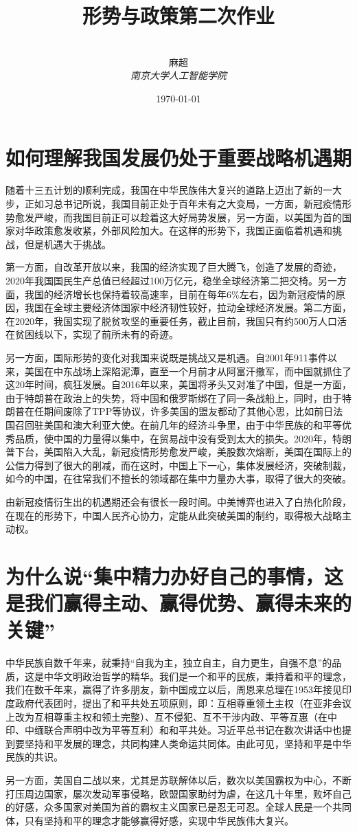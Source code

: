 \documentclass[12pt,a4paper]{article}
\title{\textbf{形势与政策第二次作业}}%
\author{
\\
\Large{麻超 \quad 201300066}
\\[6pt]
{ \large \textit{南京大学人工智能学院}}\\[2pt]
}
\date{\today}
\begin{document}
\maketitle
\setcounter{page}{1}
\section{如何理解我国发展仍处于重要战略机遇期}
随着十三五计划的顺利完成，我国在中华民族伟大复兴的道路上迈出了新的一大步，正如习总书记所说，我国目前正处于百年未有之大变局，一方面，新冠疫情形势愈发严峻，而我国目前正可以趁着这大好局势发展，另一方面，以美国为首的国家对华政策愈发收紧，外部风险加大。在这样的形势下，我国正面临着机遇和挑战，但是机遇大于挑战。
\par
第一方面，自改革开放以来，我国的经济实现了巨大腾飞，创造了发展的奇迹，2020年我国国民生产总值已经超过100万亿元，稳坐全球经济第二把交椅。另一方面，我国的经济增长也保持着较高速率，目前在每年6\%左右，因为新冠疫情的原因，我国在全球主要经济体国家中经济韧性较好，拉动全球经济发展。第二方面，在2020年，我国实现了脱贫攻坚的重要任务，截止目前，我国只有约500万人口活在贫困线以下，实现了前所未有的奇迹。
\par
另一方面，国际形势的变化对我国来说既是挑战又是机遇。自2001年911事件以来，美国在中东战场上深陷泥潭，直至一个月前才从阿富汗撤军，而中国就抓住了这20年时间，疯狂发展。自2016年以来，美国将矛头又对准了中国，但是一方面，由于特朗普在政治上的失势，将中国和俄罗斯绑在了同一条战船上，同时，由于特朗普在任期间废除了TPP等协议，许多美国的盟友都动了其他心思，比如前日法国召回驻美国和澳大利亚大使。在前几年的经济斗争里，由于中华民族的和平等优秀品质，使中国的力量得以集中，在贸易战中没有受到太大的损失。2020年，特朗普下台，美国陷入大乱，新冠疫情形势愈发严峻，美股数次熔断，美国在国际上的公信力得到了很大的削减，而在这时，中国上下一心，集体发展经济，突破制裁，如今的中国，在往常我们不擅长的领域都在集中力量办大事，取得了很大的突破。
\par
由新冠疫情衍生出的机遇期还会有很长一段时间。中美博弈也进入了白热化阶段，在现在的形势下，中国人民齐心协力，定能从此突破美国的制约，取得极大战略主动权。
\section{为什么说“集中精力办好自己的事情，这是我们赢得主动、赢得优势、赢得未来的关键”}
中华民族自数千年来，就秉持“自我为主，独立自主，自力更生，自强不息”的品质，这是中华文明政治哲学的精华。我们是一个和平的民族，秉持着和平的理念，我们在数千年来，赢得了许多朋友，新中国成立以后，周恩来总理在1953年接见印度政府代表团时，提出了和平共处五项原则，即：互相尊重领土主权（在亚非会议上改为互相尊重主权和领土完整）、互不侵犯、互不干涉内政、平等互惠（在中印、中缅联合声明中改为平等互利）和和平共处。习近平总书记在数次讲话中也提到要坚持和平发展的理念，共同构建人类命运共同体。由此可见，坚持和平是中华民族的共识。
\par
另一方面，美国自二战以来，尤其是苏联解体以后，数次以美国霸权为中心，不断打压周边国家，屡次发动军事侵略，欧盟国家助纣为虐，在这几十年里，败坏自己的好感，众多国家对美国为首的霸权主义国家已是忍无可忍。全球人民是一个共同体，只有坚持和平的理念才能够赢得好感，实现中华民族伟大复兴。
\end{document}

